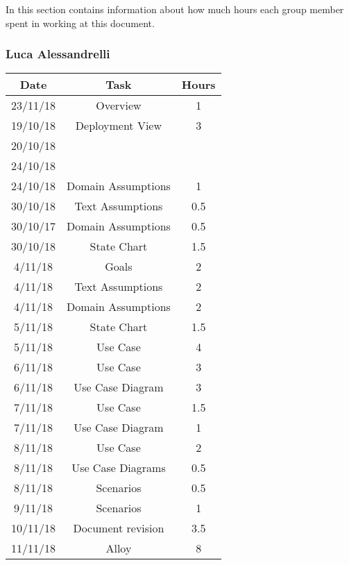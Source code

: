 In this section contains information about how much hours each group member spent in working at this document.
\bigbreak

\subsubsection{Luca Alessandrelli}
\begin{table}[h]
\centering
\begin{tabular}{|c|c|c|}
\hline
\rowcolor[HTML]{FE996B} 
Date & Task & Hours 
\\ \hline
\rowcolor[HTML]{FFFC9E} 
23/11/18  & Overview & 1  
\\ \hline
\rowcolor[HTML]{FFFC9E} 
19/10/18 & Deployment View & 3  
\\ \hline
\rowcolor[HTML]{FFFC9E}
20/10/18 & & 
\\ \hline
\rowcolor[HTML]{FFFC9E}
24/10/18 & & 
\\ \hline
\rowcolor[HTML]{FFFC9E}
24/10/18 & Domain Assumptions & 1
\\ \hline
\rowcolor[HTML]{FFFC9E}
30/10/18 & Text Assumptions & 0.5
\\ \hline
\rowcolor[HTML]{FFFC9E}
30/10/17 & Domain Assumptions & 0.5
\\ \hline
\rowcolor[HTML]{FFFC9E}
30/10/18 & State Chart & 1.5
\\ \hline
\rowcolor[HTML]{FFFC9E}
4/11/18 & Goals & 2
\\ \hline
\rowcolor[HTML]{FFFC9E}
4/11/18 & Text Assumptions & 2
\\ \hline
\rowcolor[HTML]{FFFC9E}
4/11/18 & Domain Assumptions & 2
\\ \hline
\rowcolor[HTML]{FFFC9E}
5/11/18 & State Chart & 1.5
\\ \hline
\rowcolor[HTML]{FFFC9E}
5/11/18 & Use Case & 4
\\ \hline
\rowcolor[HTML]{FFFC9E}
6/11/18 & Use Case & 3
\\ \hline
\rowcolor[HTML]{FFFC9E}
6/11/18 & Use Case Diagram & 3
\\ \hline
\rowcolor[HTML]{FFFC9E}
7/11/18 & Use Case & 1.5
\\ \hline
\rowcolor[HTML]{FFFC9E}
7/11/18 & Use Case Diagram & 1
\\ \hline
\rowcolor[HTML]{FFFC9E}
8/11/18 & Use Case & 2
\\ \hline
\rowcolor[HTML]{FFFC9E}
8/11/18 & Use Case Diagrams & 0.5
\\ \hline
\rowcolor[HTML]{FFFC9E}
8/11/18 & Scenarios & 0.5
\\ \hline
\rowcolor[HTML]{FFFC9E}
9/11/18 & Scenarios & 1
\\ \hline
\rowcolor[HTML]{FFFC9E}
10/11/18 & Document revision & 3.5
\\ \hline
\rowcolor[HTML]{FFFC9E}
11/11/18 & Alloy & 8
\\ \hline


\end{tabular}
\end{table}

